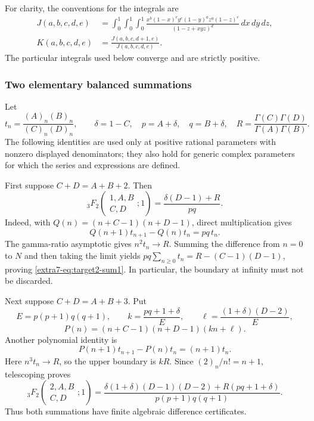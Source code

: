\documentclass[11pt,a4paper]{article}
\theoremstyle{definition}
\theoremstyle{remark}
\numberwithin{equation}{section}
\begin{document}
For clarity, the conventions for the integrals are
\begin{align*}
 J(a,b,c,d,e)&=\int_0^1\int_0^1\int_0^1
 \frac{x^b(1-x)^c y^e(1-y)^a z^a(1-z)^c}
 {(1-z+xyz)^d}\,dx\,dy\,dz,\\
 K(a,b,c,d,e)&=\frac{J(a,b,c,d+1,e)}{J(a,b,c,d,e)}.
\end{align*}
The particular integrals used below converge and are strictly positive.

\subsubsection{Two elementary balanced summations}

Let
\[
 t_n=\frac{(A)_n(B)_n}{(C)_n(D)_n},\qquad
 \delta=1-C,\quad p=A+\delta,\quad q=B+\delta,
 \quad R=\frac{\Gamma(C)\Gamma(D)}{\Gamma(A)\Gamma(B)}.
\]
The following identities are used only at positive rational parameters
with nonzero displayed denominators; they also hold for generic complex
parameters for which the series and expressions are defined.

First suppose $C+D=A+B+2$.  Then
\begin{equation}\label{extra7-eq:target2-sum1}
 {}_3F_2\left(\begin{matrix}1,A,B\\ C,D\end{matrix};1\right)
 =\frac{\delta(D-1)+R}{pq}.
\end{equation}
Indeed, with $Q(n)=(n+C-1)(n+D-1)$, direct multiplication gives
\[
 Q(n+1)t_{n+1}-Q(n)t_n=pq\,t_n.
\]
The gamma-ratio asymptotic gives $n^2t_n\longrightarrow R$.
Summing the difference from $n=0$ to $N$ and then taking the limit yields
$pq\sum_{n\geq0}t_n=R-(C-1)(D-1)$, proving
\eqref{extra7-eq:target2-sum1}.  In particular, the boundary at infinity must
not be discarded.

Next suppose $C+D=A+B+3$.  Put
\[
 E=p(p+1)q(q+1),\qquad
 k=\frac{pq+1+\delta}{E},\qquad
 \ell=\frac{(1+\delta)(D-2)}{E},
\]
\[
 P(n)=(n+C-1)(n+D-1)(kn+\ell).
\]
Another polynomial identity is
\[
 P(n+1)t_{n+1}-P(n)t_n=(n+1)t_n.
\]
Here $n^3t_n\longrightarrow R$, so the upper boundary is $kR$.
Since $(2)_n/n!=n+1$, telescoping proves
\begin{equation}\label{extra7-eq:target2-sum2}
 {}_3F_2\left(\begin{matrix}2,A,B\\ C,D\end{matrix};1\right)
 =\frac{\delta(1+\delta)(D-1)(D-2)
       +R(pq+1+\delta)}{p(p+1)q(q+1)}.
\end{equation}
Thus both summations have finite algebraic difference certificates.
\end{document}
